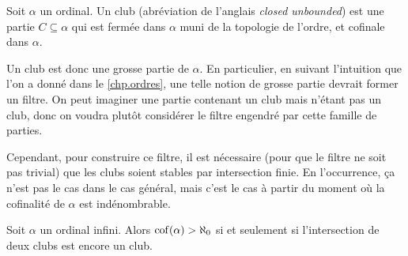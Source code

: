\begin{definition}[Club]
  Soit $\alpha$ un ordinal. Un club (abréviation de l'anglais
  \emph{closed unbounded}) est une partie $C\subseteq \alpha$ qui est fermée
  dans $\alpha$ muni de la topologie de l'ordre, et cofinale dans $\alpha$.
\end{definition}

Un club est donc une grosse partie de $\alpha$. En particulier, en suivant
l'intuition que l'on a donné dans le \cref{chp.ordres}, une telle notion de
grosse partie devrait former un filtre. On peut imaginer une partie contenant
un club mais n'étant pas un club, donc on voudra plutôt considérer le filtre
engendré par cette famille de parties.

Cependant, pour construire ce filtre, il est nécessaire (pour que le filtre ne
soit pas trivial) que les clubs soient stables par intersection finie. En
l'occurrence, ça n'est pas le cas dans le cas général, mais c'est le cas à
partir du moment où la cofinalité de $\alpha$ est indénombrable.

\begin{proposition}
  Soit $\alpha$ un ordinal infini. Alors $\operatorname{cof}(\alpha) > \aleph_0$ si et
  seulement si l'intersection de deux clubs est encore un club.
\end{proposition}

